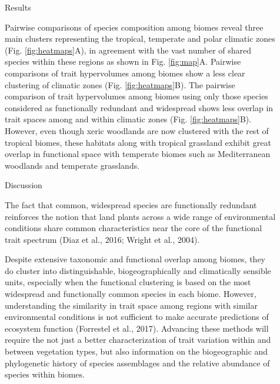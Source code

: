 \documentclass[final]{beamer}
\newlength{\sepwid}
\newlength{\onecolwid}
\newlength{\twocolwid}
\begin{document}
\begin{frame}[t]
\begin{columns}[t]
\begin{column}{\twocolwid}
\begin{block}{Results}
\begin{multicols}{2}
Pairwise comparisons of species composition among biomes reveal three main clusters representing the tropical, temperate and polar climatic zones (Fig. \ref{fig:heatmaps}A), in agreement with the vast number of shared species within these regions as shown in Fig. \ref{fig:map}A. Pairwise comparisons of trait hypervolumes among biomes show a less clear clustering of climatic zones (Fig. \ref{fig:heatmaps}B). The pairwise comparison of trait hypervolumes among biomes using only those species considered as functionally redundant and widespread shows less overlap in trait spaces among and within climatic zones (Fig. \ref{fig:heatmaps}B). However, even though xeric woodlands are now clustered with the rest of tropical biomes, these habitats along with tropical grassland exhibit great overlap in functional space with temperate biomes such as Mediterranean woodlands and temperate grasslands. 

\end{multicols}
\end{block}



			\begin{alertblock}{Discussion}
			
The fact that common, widespread species are functionally redundant reinforces the notion that land plants across a wide range of environmental conditions share common characteristics near the core of the functional trait spectrum (Diaz et al., 2016; Wright et al., 2004). 

Despite extensive taxonomic and functional overlap among biomes, they do cluster into distinguishable, biogeographically and climatically sensible units, especially when the functional clustering is based on the most widespread and functionally common species in each biome. However, understanding the similarity in trait space among regions with similar environmental conditions is not sufficient to make accurate predictions of ecosystem function (Forrestel et al., 2017). Advancing these methods will require the not just a better characterization of trait variation within and between vegetation types, but also information on the biogeographic and phylogenetic history of species assemblages and the relative abundance of species within biomes.

      		\end{alertblock}

 \end{column}



  \begin{column}{\sepwid}\end{column}			%
  \begin{column}{\onecolwid}




\end{column}
\end{columns}
\end{frame}
\end{document}

